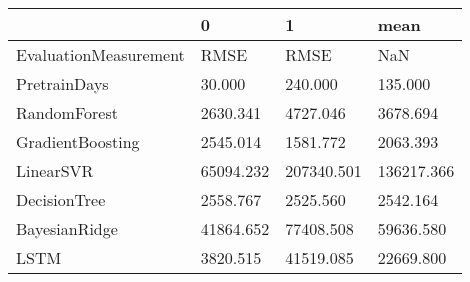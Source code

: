 \begin{tabular}{llll}
\toprule
{} &          0 &           1 &        mean \\
\midrule
EvaluationMeasurement &       RMSE &        RMSE &         NaN \\
PretrainDays          &     30.000 &     240.000 &     135.000 \\
RandomForest          &   2630.341 &    4727.046 &    3678.694 \\
GradientBoosting      &   2545.014 &    1581.772 &    2063.393 \\
LinearSVR             &  65094.232 &  207340.501 &  136217.366 \\
DecisionTree          &   2558.767 &    2525.560 &    2542.164 \\
BayesianRidge         &  41864.652 &   77408.508 &   59636.580 \\
LSTM                  &   3820.515 &   41519.085 &   22669.800 \\
\bottomrule
\end{tabular}
